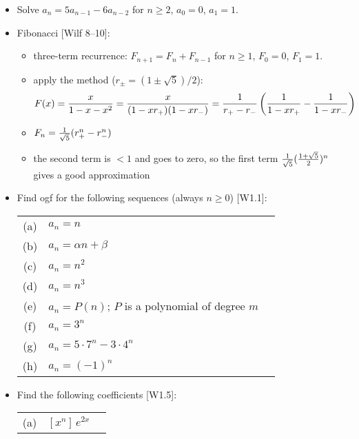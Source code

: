 \documentclass[10pt, a4paper]{article}
\def\ans#1{\big[\hskip 2mm {#1}\hskip 2mm\big]}
\def\xD{x{\rm D}}
\begin{document}
\begin{itemize}
\item
Solve $a_n=5a_{n-1}-6a_{n-2}$ for $n\ge 2$, $a_0 = 0$, $a_1=1$. \ans{$G(x) = {x\over (1-2x)(1-3x)}$; $a_n = 3^n-2^n$}

\item 
Fibonacci [Wilf 8--10]:
\begin{itemize}
    \item three-term recurrence: $F_{n+1}=F_n+F_{n-1}$ for $n\ge 1$, $F_0=0$, $F_1=1$.
    \item apply the method ($r_\pm = (1\pm \sqrt 5)/2$): $$\displaystyle F(x) = {x\over 1-x-x^2} = {x\over (1-xr_{+})(1-xr_{-})}={1\over r_{+}-r_{-}}\left({1\over 1-xr_{+}}-{1\over 1-xr_{-}}\right)$$
    \item $F_n={1\over \sqrt 5}(r_{+}^n-r_{-}^n)$
    \item the second term is ${} < 1$ and goes to zero, so the first term ${1\over \sqrt 5}({1+\sqrt 5\over 2})^n$ gives a good approximation
\end{itemize}
    
\item
Find ogf for the following sequences (always $n\ge 0$) [W1.1]:

\setlength\extrarowheight{1mm}
\begin{tabular}{cl@{\hskip 5mm}l}
    (a) & $a_n = n$ & \ans{introduce $\xD$; $(\xD){1\over 1-x} = {x\over (1-x)^2}$}\\
    (b) & $a_n = \alpha n + \beta$ & \ans{$\alpha x/(1-x)^2+\beta/(1-x)$}\\
    (c) & $a_n = n^2$ & \ans{$(\xD)^2 1/(1-x) = {1+x\over (1-x)^3}$}\\
    (d) & $a_n = n^3$ & \ans{$(\xD)^3 1/(1-x)$}\\
    (e) & $a_n = P(n)$; $P$ is a polynomial of degree $m$ & \ans{$P(\xD){1\over 1-x}$}\\
    (f) & $a_n = 3^n$ & \ans{$1/(1-3x)$}\\
    (g) & $a_n = 5\cdot 7^n-3\cdot 4^n$ & \ans{${5\over (1-7x)}-{3\over 1-4x}$}\\
    (h) & $a_n = (-1)^n$ & \ans{$1/(1+x)$}\\
\end{tabular}

\item 
Find the following coefficients [W1.5]:
\begin{center}
\setlength\extrarowheight{1mm}
\begin{tabular}{cl@{\hskip 5mm}l}
    (a) & $[x^n]\, e^{2x}$ & \ans{$2^n/n!$}\\


\end{tabular}
\end{center}
\end{itemize}
\end{document}
